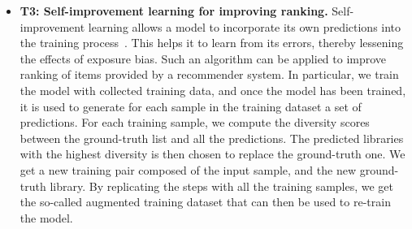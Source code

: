 \begin{itemize}
	\item \textbf{T3: Self-improvement learning for improving ranking.} %
	Self-improvement learning allows a model to incorporate its own predictions into the training process~\cite{wang2020exposure}. This helps it to learn from its errors, thereby lessening the effects of exposure bias. Such an algorithm can be applied to improve ranking of items provided by a recommender system. In particular, we train the model with collected training data, and once the model has been trained, it is used to generate for each sample in the training dataset a set of predictions. For each training sample, we compute the diversity scores between the ground-truth list and all the predictions. The predicted libraries with the highest diversity is then chosen to replace the ground-truth one. We get a new training pair composed of the input sample, and the new ground-truth library. By replicating the steps with all the training samples, we get the so-called augmented training dataset that can then be used to re-train the model.

\end{itemize}
\vspace{-.4cm}





